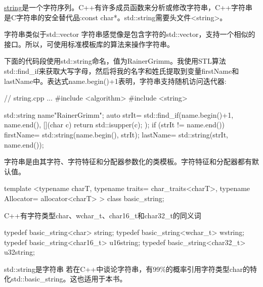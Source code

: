 
\href{http://en.cppreference.com/w/cpp/string/basic_string}{string}是一个字符序列。C++有许多成员函数来分析或修改字符串，C++字符串是C字符串的安全替代品:const char*。std::string需要头文件<string>。



\begin{myTip}{字符串类似于std::vector}
字符串感觉像是包含字符的std::vector，支持一个相似的接口。所以，可使用标准模板库的算法来操作字符串。

下面的代码段使用std::string命名，值为RainerGrimm。我使用STL算法std::find\_if来获取大写字母，然后将我的名字和姓氏提取到变量firstName和lastName中。表达式name.begin()+1表明，字符串支持随机访问迭代器:


\begin{cpp}
// string.cpp
...
#include <algorithm>
#include <string>

std::string name{"RainerGrimm"};
auto strIt= std::find_if(name.begin()+1, name.end(),
						[](char c){ return std::isupper(c); });
if (strIt != name.end()){
	firstName= std::string(name.begin(), strIt);
	lastName= std::string(strIt, name.end());
}
\end{cpp}
\end{myTip}

字符串是由其字符、字符特征和分配器参数化的类模板。字符特征和分配器都有默认值。

\begin{cpp}
template <typename charT,
		  typename traits= char_traits<charT>,
		  typename Allocator= allocator<charT> >
class basic_string;
\end{cpp}

C++有字符类型char、wchar\_t、char16\_t和char32\_t的同义词

\begin{cpp}
typedef basic_string<char> string;
typedef basic_string<wchar_t> wstring;
typedef basic_string<char16_t> u16string;
typedef basic_string<char32_t> u32string;
\end{cpp}

\begin{myTip}{std::string是字符串}
若在C++中谈论字符串，有99\%的概率引用字符类型char的特化std::basic\_string。这也适用于本书。
\end{myTip}



























